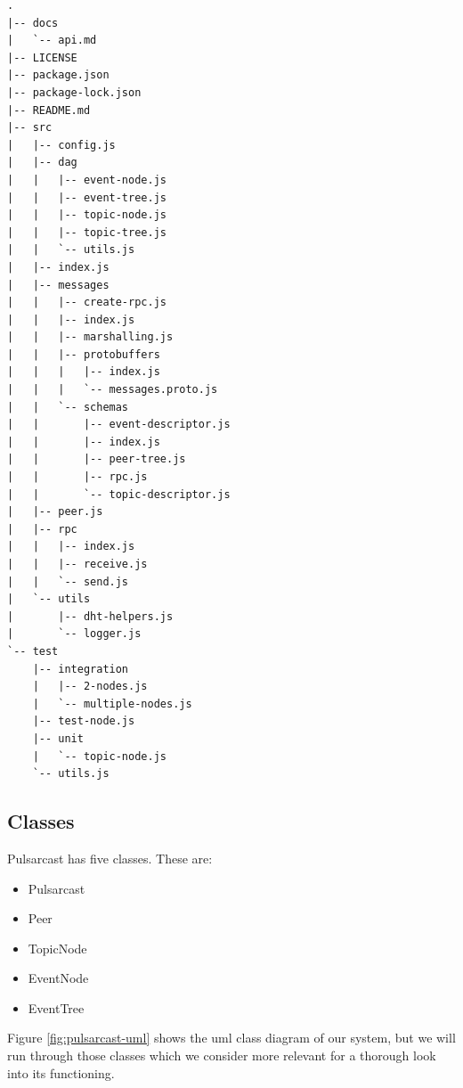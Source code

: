 \begin{lstlisting}[float, caption={File tree for our Pulsarcast implementation},label={file-tree}]
.
|-- docs
|   `-- api.md
|-- LICENSE
|-- package.json
|-- package-lock.json
|-- README.md
|-- src
|   |-- config.js
|   |-- dag
|   |   |-- event-node.js
|   |   |-- event-tree.js
|   |   |-- topic-node.js
|   |   |-- topic-tree.js
|   |   `-- utils.js
|   |-- index.js
|   |-- messages
|   |   |-- create-rpc.js
|   |   |-- index.js
|   |   |-- marshalling.js
|   |   |-- protobuffers
|   |   |   |-- index.js
|   |   |   `-- messages.proto.js
|   |   `-- schemas
|   |       |-- event-descriptor.js
|   |       |-- index.js
|   |       |-- peer-tree.js
|   |       |-- rpc.js
|   |       `-- topic-descriptor.js
|   |-- peer.js
|   |-- rpc
|   |   |-- index.js
|   |   |-- receive.js
|   |   `-- send.js
|   `-- utils
|       |-- dht-helpers.js
|       `-- logger.js
`-- test
    |-- integration
    |   |-- 2-nodes.js
    |   `-- multiple-nodes.js
    |-- test-node.js
    |-- unit
    |   `-- topic-node.js
    `-- utils.js
\end{lstlisting}

\subsection{Classes}\label{subsec:classes}

Pulsarcast has five classes. These are:

\begin{itemize}
  \item
    Pulsarcast
  \item
		Peer
  \item
    TopicNode
  \item
    EventNode
  \item
    EventTree
\end{itemize}

Figure \ref{fig:pulsarcast-uml} shows the \acrfull{uml} class diagram of our
system, but we will run through those classes which we consider more relevant
for a thorough look into its functioning.

